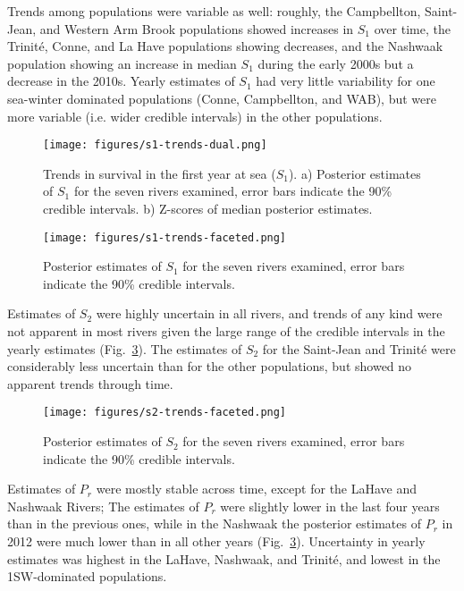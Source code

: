 \documentclass[12pt]{article}
\newcommand{\So}{$S_{1}$\xspace}
\newcommand{\St}{$S_{2}$\xspace}
\newcommand{\Pg}{$P_r$\xspace}
\begin{document}
Trends among populations were variable as well: roughly, the Campbellton,
Saint-Jean, and Western Arm Brook populations showed increases in \So
over time, the Trinit\'{e}, Conne, and La Have populations showing decreases,
and the Nashwaak population showing an increase in median \So during the early
2000s but a decrease in the 2010s. Yearly estimates of \So had very little
variability for one sea-winter dominated populations (Conne, Campbellton, and
WAB), but were more variable (i.e. wider credible intervals) in the other
populations.

\begin{figure}[htbp] \centering
    \texttt{[image: figures/s1-trends-dual.png]}
    \caption{Trends in survival in the first year at sea (\So). a) Posterior
        estimates of \So for the seven rivers examined, error bars indicate
        the 90\% credible intervals. b) Z-scores of median posterior
        estimates.} \label{fig:s1-dual} 
\end{figure}

\begin{figure}[htbp] \centering
    \texttt{[image: figures/s1-trends-faceted.png]}
    \caption{Posterior estimates of \So for the seven rivers examined, error
        bars indicate the 90\% credible intervals.} \label{fig:s1-faceted}
\end{figure}

Estimates of \St were highly uncertain in all rivers, and trends of any kind
were not apparent in most rivers given the large range of the credible
intervals in the yearly estimates (Fig.~\ref{fig:s2-faceted}). The estimates
of \St for the Saint-Jean and Trinit\'{e} were considerably less uncertain
than for the other populations, but showed no apparent trends through time.

\begin{figure}[htbp] \centering
    \texttt{[image: figures/s2-trends-faceted.png]}
    \caption{Posterior estimates of \St for the seven rivers examined, error
        bars indicate the 90\% credible intervals.} \label{fig:s2-faceted}
\end{figure}

Estimates of \Pg were mostly stable across time, except for the LaHave and
Nashwaak Rivers; The estimates of \Pg were slightly lower in the last four
years than in the previous ones, while in the Nashwaak the posterior estimates
of \Pg in 2012 were much lower than in all other years
(Fig.~\ref{fig:s2-faceted}). Uncertainty in yearly estimates was highest in
the LaHave, Nashwaak, and Trinit\'{e}, and lowest in the 1SW-dominated
populations.
\end{document}
